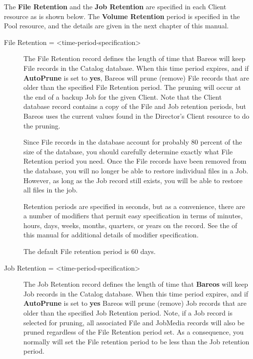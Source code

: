 The {\bf File Retention} and the {\bf Job Retention} are specified in each
Client resource as is shown below. The {\bf Volume Retention} period is
specified in the Pool resource, and the details are given in the next chapter
of this manual.

\begin{description}

\item [File Retention = {\textless}time-period-specification{\textgreater}]
   The  File Retention record defines the length of time that  Bareos will keep
File records in the Catalog database.  When this time period expires, and if
{\bf AutoPrune} is set to {\bf yes}, Bareos will prune (remove) File records
that  are older than the specified File Retention period. The pruning  will
occur at the end of a backup Job for the given Client.  Note that the Client
database record contains a copy of the  File and Job retention periods, but
Bareos uses the  current values found in the Director's Client resource to  do
the pruning.

Since File records in the database account for probably 80 percent of the
size of the database, you should carefully determine exactly what File
Retention period you need. Once the File records have been removed from
the database, you will no longer be able to restore individual files
in a Job. However, as long as the
Job record still exists, you will be able to restore all files in the
job.

Retention periods are specified in seconds, but as a convenience, there are
a number of modifiers that permit easy specification in terms of minutes,
hours, days, weeks, months, quarters, or years on the record.  See the
 of this manual for additional details
of modifier specification.

The default File retention period is 60 days.

\item [Job Retention = {\textless}time-period-specification{\textgreater}]
   The Job Retention record defines the length of time that {\bf Bareos}
will keep Job records in the Catalog database.  When this time period
expires, and if {\bf AutoPrune} is set to {\bf yes} Bareos will prune
(remove) Job records that are older than the specified Job Retention
period.  Note, if a Job record is selected for pruning, all associated File
and JobMedia records will also be pruned regardless of the File Retention
period set.  As a consequence, you normally will set the File retention
period to be less than the Job retention period.


\end{description}
